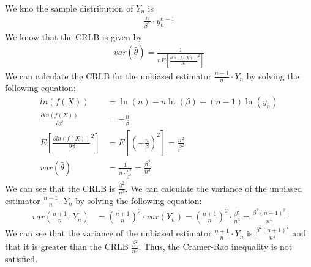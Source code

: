 \documentclass[answers,12pt,addpoints]{exam}
\begin{document}
\begin{questions}
    \begin{solution}
        We kno the sample distribution of $Y_n$ is 
        \begin{align*}
            \frac{n}{\beta^n} \cdot y^{n-1}_n 
        \end{align*}
        We know that the CRLB is given by 
        \begin{align*}
            var(\hat{\theta}) = \frac{1}{n E\left[\frac{\partial ln(f(X))}{\partial \theta}^2 \right]}
        \end{align*}
        We can calculate the CRLB for the unbiased estimator $\frac{n + 1}{n} \cdot Y_n$ by solving the following equation:
        \begin{align*}
            ln(f(X)) &= \ln(n) - n \ln(\beta) + (n-1)\ln(y_n)  \\
            \frac{\partial ln(f(X))}{\partial \beta} &= -\frac{n}{\beta} \\
            E\left[\frac{\partial ln(f(X))}{\partial \beta}^2 \right] &= E\left[\left(-\frac{n}{\beta}\right)^2 \right] = \frac{n^2}{\beta^2} \\
            var(\hat{\theta}) &= \frac{1}{n \cdot \frac{n^2}{\beta^2}} = \frac{\beta^2}{n^3}
        \end{align*}
        We can see that the CRLB is $\frac{\beta^2}{n^3}$. We can calculate the variance of the unbiased estimator $\frac{n + 1}{n} \cdot Y_n$ by solving the following equation:
        \begin{align*}
            var\left(\frac{n + 1}{n} \cdot Y_n\right) &= \left(\frac{n + 1}{n}\right)^2 \cdot var(Y_n) = \left(\frac{n + 1}{n}\right)^2 \cdot \frac{\beta^2}{n^3} = \frac{\beta^2(n+1)^2}{n^4}
        \end{align*}
        We can see that the variance of the unbiased estimator $\frac{n + 1}{n} \cdot Y_n$ is $\frac{\beta^2(n+1)^2}{n^4}$ and that it is greater than the CRLB $\frac{\beta^2}{n^3}$. Thus, the Cramer-Rao inequality is not satisfied.
    \end{solution}

\end{questions}
\end{document}
